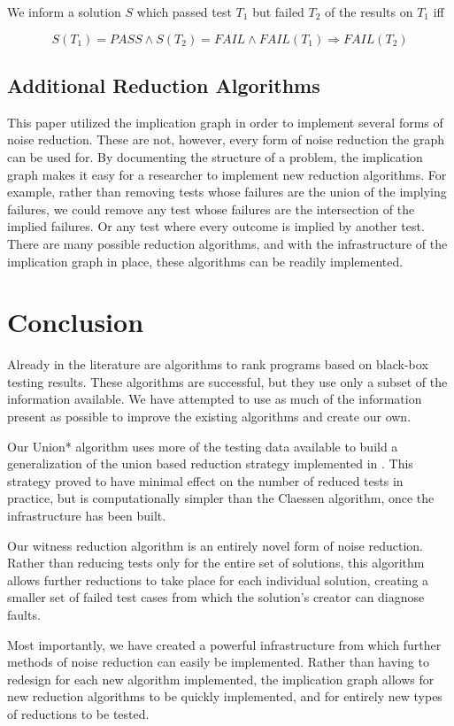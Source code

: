 \documentclass[11pt,twoside]{article}
\newcommand\fail{\mathit{FAIL}}
\let\cite=\citep
\begin{document}
\centerline{We inform a solution $S$ which passed test $T_1$ but failed $T_2$ of the results on  $T_1$ iff}
$$ S(T_1) = PASS \wedge S(T_2) = \fail \wedge \fail(T_1) \Rightarrow \fail(T_2)$$

\subsection{Additional Reduction Algorithms}


This paper utilized the implication graph in order to implement several forms of noise reduction. These are not, however, every form of noise reduction the graph can be used for. By documenting the structure of a problem, the implication graph makes it easy for a researcher to implement new reduction algorithms. For example, rather than removing tests whose failures are the union of the implying failures, we could remove any test whose failures are the intersection of the implied failures. Or any test where every outcome is implied by another test. There are many possible reduction algorithms, and with the infrastructure of the implication graph in place, these algorithms can be readily implemented.

\section{Conclusion}
Already in the literature are algorithms to rank programs based on black-box testing results. These algorithms are successful, but they use only a subset of the information available. We have attempted to use as much of the information present as possible to improve the existing algorithms and create our own.

Our Union* algorithm uses more of the testing data available to build a generalization of the union based reduction strategy implemented in \cite{Claessen}. This strategy proved to have minimal effect on the number of reduced tests in practice, but is computationally simpler than the Claessen algorithm, once the infrastructure has been built.

Our witness reduction algorithm is an entirely novel form of noise reduction. Rather than reducing tests only for the entire set of solutions, this algorithm allows further reductions to take place for each individual solution, creating a smaller set of failed test cases from which the solution's creator can diagnose faults.

Most importantly, we have created a powerful infrastructure from which further methods of noise reduction can easily be implemented. Rather than having to redesign for each new algorithm implemented, the implication graph allows for new reduction algorithms to be quickly implemented, and for entirely new types of reductions to be tested.



\end{document}
